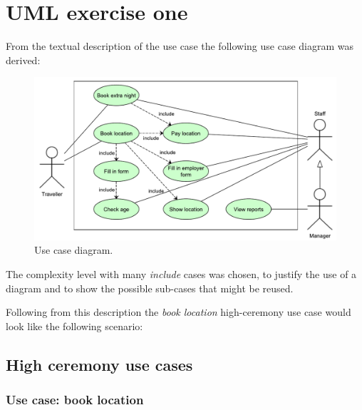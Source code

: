 \chapter{UML exercise one}\label{ch:uml}

From the textual description of the use case the following use case diagram was derived:

\begin{figure}[H]
\begin{center}
\includegraphics[width=\textwidth]{gfx/usecase.pdf} 
\end{center}
\caption{Use case diagram.}
\label{fig:usecase}
\end{figure}

The complexity level with many \textit{include} cases was chosen, to justify the use of a diagram and to show the possible sub-cases that might be reused.

Following from this description the \textit{book location} high-ceremony use case would look like the following scenario:

\section{High ceremony use cases}

\subsection{Use case: book location}

